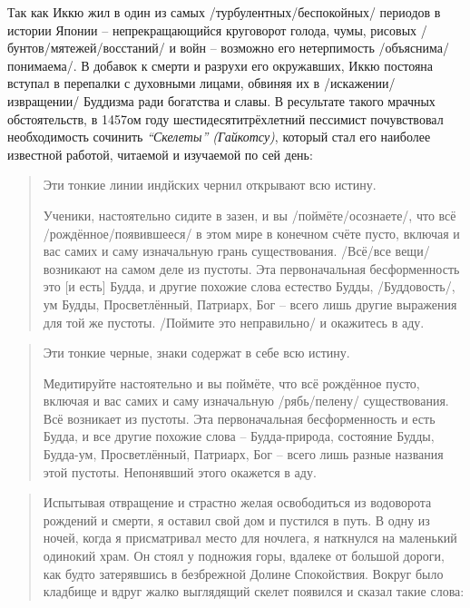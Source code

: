 \begin{ver}
Так как Иккю жил в один из самых /турбулентных/беспокойных/ периодов в истории
Японии -- непрекращающийся круговорот голода, чумы, рисовых
/бунтов/мятежей/восстаний/ и войн -- возможно его нетерпимость
/объяснима/понимаема/. В добавок к смерти и разрухи его окружавших,
Иккю постояна вступал в перепалки с духовными лицами, обвиняя их в
/искажении/извращении/ Буддизма ради богатства и славы.
В ресультате такого мрачных обстоятельств, в 1457ом году
шестидесятитрёхлетний пессимист почувствовал необходимость
сочинить \textit{``Скелеты'' (Гайкотсу)}, который стал его наиболее
известной работой, читаемой и изучаемой по сей день:
\end{ver}

\begin{ver}
\begin{quote}
  Эти тонкие линии индйских чернил открывают всю истину. 
  
  Ученики, настоятельно сидите в зазен, и вы /поймёте/осознаете/, что
  всё /рождённое/появившееся/ в этом мире в конечном счёте пусто,
  включая и вас самих и саму изначальную грань существования.
  /Всё/все вещи/ возникают  на самом деле из пустоты. Эта
  первоначальная бесформенность это [и есть] Будда, и другие похожие
  слова естество Будды, /Буддовость/, ум Будды,
  Просветлённый, Патриарх, Бог -- всего лишь другие выражения для той
  же пустоты. /Поймите это неправильно/ и окажитесь в аду.
  \end{quote}
  \end{ver}

\begin{ver}[1]
\begin{quote}
  Эти тонкие черные, знаки содержат в себе всю истину.

  Медитируйте настоятельно и вы поймёте, что всё рождённое пусто,
  включая и вас самих и саму изначальную /рябь/пелену/
  существования. Всё возникает из пустоты. Эта первоначальная
  бесформенность и есть Будда, и все другие похожие слова --
  Будда-природа, состояние Будды, Будда-ум, Просветлённый, Патриарх,
  Бог -- всего лишь разные названия этой пустоты. Непонявший этого
  окажется в аду.
\end{quote}
\end{ver}

\begin{ver}
\begin{quote}
  Испытывая отвращение и страстно желая освободиться из водоворота
  рождений и смерти, я оставил свой дом и пустился в путь.
  В одну из ночей, когда я присматривал место для ночлега, я наткнулся
  на маленький одинокий храм. Он стоял у подножия горы, вдалеке от
  большой дороги, как будто затерявшись в безбрежной Долине
  Спокойствия.
  Вокруг было кладбище и вдруг жалко выглядящий скелет появился и
  сказал такие слова:
\end{quote}
\end{ver}

